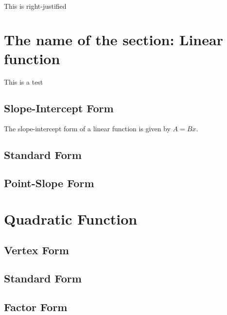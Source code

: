 \documentclass[11pt]{article}
\begin{document}
\begin{flushright} This is right-justified \end{flushright}


\section{The name of the section: Linear function}
This is a test 
    \subsection{Slope-Intercept Form}
    The slope-intercept form of a linear function is given by $A=Bx$.
    \subsection{Standard Form}
    \subsection{Point-Slope Form}
\section{Quadratic Function}
    \subsection{Vertex Form}
    \subsection{Standard Form}
    \subsection{Factor Form}
\end{document}
